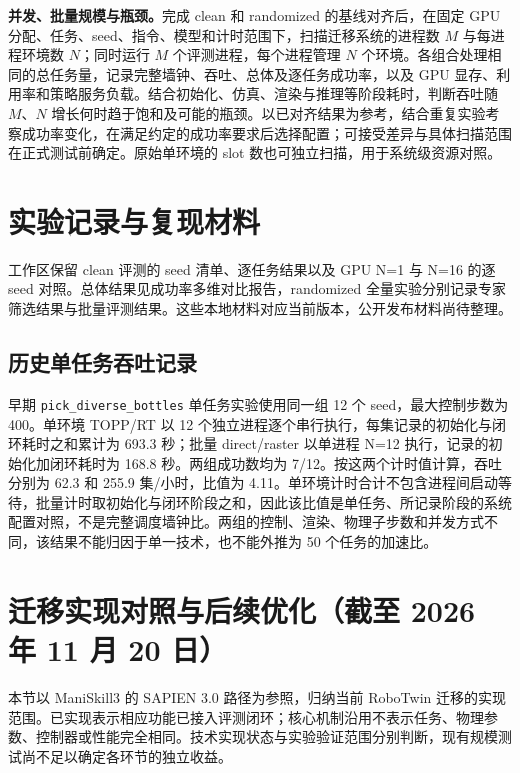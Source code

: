 \documentclass{article}
\begin{document}
\textbf{并发、批量规模与瓶颈。}完成 clean 和 randomized 的基线对齐后，在固定 GPU 分配、任务、seed、指令、模型和计时范围下，扫描迁移系统的进程数 $M$ 与每进程环境数 $N$；同时运行 $M$ 个评测进程，每个进程管理 $N$ 个环境。各组合处理相同的总任务量，记录完整墙钟、吞吐、总体及逐任务成功率，以及 GPU 显存、利用率和策略服务负载。结合初始化、仿真、渲染与推理等阶段耗时，判断吞吐随 $M$、$N$ 增长何时趋于饱和及可能的瓶颈。以已对齐结果为参考，结合重复实验考察成功率变化，在满足约定的成功率要求后选择配置；可接受差异与具体扫描范围在正式测试前确定。原始单环境的 slot 数也可独立扫描，用于系统级资源对照。

\appendix
\section{实验记录与复现材料}
工作区保留 clean 评测的 seed 清单、逐任务结果以及 GPU N=1 与 N=16 的逐 seed 对照。总体结果见成功率多维对比报告，randomized 全量实验分别记录专家筛选结果与批量评测结果。这些本地材料对应当前版本，公开发布材料尚待整理。

\subsection{历史单任务吞吐记录}
早期 \texttt{pick\_diverse\_bottles} 单任务实验使用同一组 12 个 seed，最大控制步数为 400。单环境 TOPP/RT 以 12 个独立进程逐个串行执行，每集记录的初始化与闭环耗时之和累计为 693.3 秒；批量 direct/raster 以单进程 N=12 执行，记录的初始化加闭环耗时为 168.8 秒。两组成功数均为 7/12。按这两个计时值计算，吞吐分别为 62.3 和 255.9 集/小时，比值为 4.11。单环境计时合计不包含进程间启动等待，批量计时取初始化与闭环阶段之和，因此该比值是单任务、所记录阶段的系统配置对照，不是完整调度墙钟比。两组的控制、渲染、物理子步数和并发方式不同，该结果不能归因于单一技术，也不能外推为 50 个任务的加速比。

\clearpage
\section{迁移实现对照与后续优化（截至 2026 年 11 月 20 日）}
\label{app:implementation}
本节以 ManiSkill3 的 SAPIEN 3.0 路径为参照，归纳当前 RoboTwin 迁移的实现范围。已实现表示相应功能已接入评测闭环；核心机制沿用不表示任务、物理参数、控制器或性能完全相同。技术实现状态与实验验证范围分别判断，现有规模测试尚不足以确定各环节的独立收益。
\end{document}
